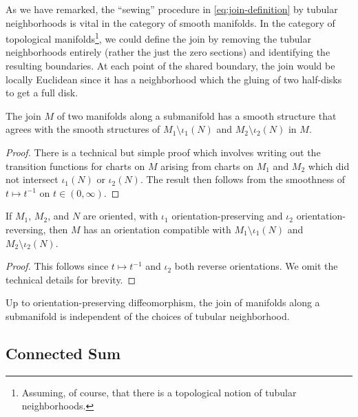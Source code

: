 \begin{remark}
	As we have remarked, the ``sewing'' procedure in \cref{eq:join-definition} by tubular neighborhoods is vital in the category of smooth manifolds. In the category of topological manifolds\footnote{Assuming, of course, that there is a topological notion of  tubular neighborhoods.}, we could define the join by removing the tubular neighborhoods entirely (rather the just the zero sections) and identifying the resulting boundaries.
	At each point of the shared boundary, the join would be locally Euclidean since it has a neighborhood which the gluing of two half-disks to get a full disk.
\end{remark}

\begin{proposition}\label{prop:join-along-submanifolds-well-defined}
	The join $M$ of two manifolds along a submanifold has a smooth structure that agrees with the smooth structures of $M_1\setminus \iota_1(N)$ and $M_2\setminus \iota_2(N)$ in $M$. 
\end{proposition}
\begin{proof}
	There is a technical but simple proof which involves writing out the transition functions for charts on $M$ arising from charts on $M_1$ and $M_2$ which did not intersect $\iota_1(N)$ or $\iota_2(N)$. The result then follows from the smoothness of $t \mapsto t^{-1}$ on $t\in (0,\infty)$.
\end{proof}

\begin{proposition}\label{prop:join-along-submanifolds-orientation}
	If $M_1$, $M_2$, and $N$ are oriented, with $\iota_1$ orientation-preserving and $\iota_2$ orientation-reversing, then $M$ has an orientation compatible with $M_1\setminus \iota_1(N)$ and $M_2\setminus \iota_2(N)$.
\end{proposition}
\begin{proof}
	This follows since $t\mapsto t^{-1}$ and $\iota_2$ both reverse orientations. We omit the technical details for brevity.
\end{proof}

\begin{theorem}
	Up to orientation-preserving diffeomorphism, the join of manifolds along a submanifold is independent of the choices of tubular neighborhood.
\end{theorem}

\subsection{Connected Sum}\label{sec:connected-sum}


